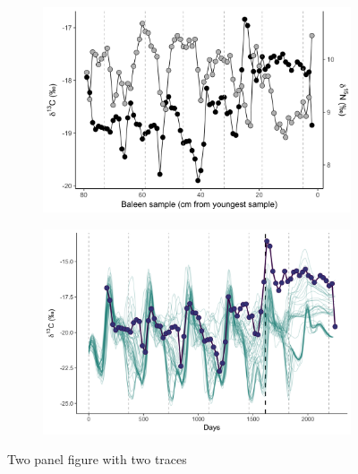 \documentclass[a4paper,12pt]{article}
\begin{document}
\begin{figure}
  \centering
    \begin{subfigure}{0.8\textwidth}
      \centering
      \includegraphics[width = \linewidth]{figures/Figure-1a-raw-dC-dN-data.png}
      \label{fig1a}
    \end{subfigure}

    \begin{subfigure}{0.8\textwidth}
      \centering
      \includegraphics[width = \linewidth]{figures/Figure-1c-migratory-model-d13C.png}
      \label{fig1b}
    \end{subfigure} 
  \caption{Two panel figure with two traces}
\end{figure}
\end{document}
